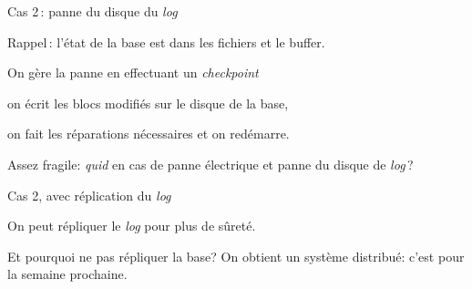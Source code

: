 \documentclass[aspectratio=169, handout]{beamer} %
\begin{document}
\begin{frame}{Cas 2\,: panne du disque du \textit{log}}

Rappel\,: l'état de la base est dans les fichiers \alert{et} le buffer.

\vfill

On gère la panne en effectuant un \textit{checkpoint}

\begin{redbullet}
  \item on écrit les blocs modifiés sur le disque de la base,
        \item on fait les réparations nécessaires et on redémarre.
\end{redbullet}

\vfill

\begin{blocgauche}
Assez fragile: \textit{quid} en cas de panne électrique
\alert{et} panne du disque de \textit{log}\,?
\end{blocgauche}

\end{frame}


\begin{frame}{Cas 2, avec réplication du \textit{log}}

On peut répliquer le \textit{log} pour plus de sûreté.

\vfill


\vfill

\begin{blocgauche}
Et pourquoi ne pas répliquer la base? On obtient un \alert{système
distribué}: c'est pour la semaine prochaine.
\end{blocgauche}

\end{frame}
\end{document}
